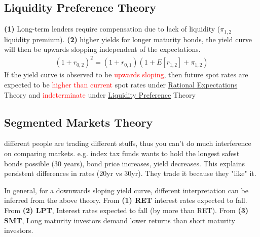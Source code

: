 \begin{multicols}{2}
\subsection{Liquidity Preference Theory}
\textbf{(1)} Long-term lenders require compensation due to lack of liquidity ($\pi_{1,2}$ liquidity premium). \textbf{(2)} higher yields for longer maturity bonds, the yield curve will then be upwards slopping independent of the expectations. 
\begin{gather*}
    (1+r_{0,2})^2 = (1+r_{0,1})(1+E[r_{1,2}]+\pi_{1,2})
\end{gather*}
If the yield curve is observed to be \textcolor{red}{upwards sloping}, then future spot rates are expected to be \textcolor{red}{higher than current} spot rates under \underline{Rational Expectations} Theory and \textcolor{red}{indeterminate} under \underline{Liquidity Preference} Theory
\subsection{Segmented Markets Theory}
different people are trading different stuffs, thus you can't do much interference on comparing markets. e.g. index tax funds wants to hold the longest safest bonds possible (30 years), bond price increases, yield decreases. This explains persistent differences in rates (20yr vs 30yr). They trade it because they "like" it.\par

In general, for a downwards sloping yield curve, different interpretation can be inferred from the above theory. From \textbf{(1) RET} interest rates expected to fall. From \textbf{(2) LPT}, Interest rates expected to fall (by more than RET). From \textbf{(3) SMT}, Long maturity investors demand lower returns than short maturity investors.


\end{multicols}
